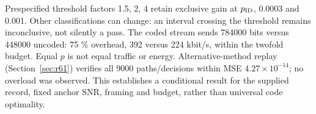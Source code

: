 Prespecified threshold factors 1.5, 2, 4 retain exclusive gain at $ p_{\rm ID}$,
0.0003 and 0.001. Other classifications can change: an interval crossing
the threshold remains inconclusive, not silently a pass.
The coded stream sends 784000 bits versus 448000 uncoded: 75 \% overhead,
392 versus 224 kbit/s, within the twofold budget. Equal $ p $ is not equal
traffic or energy. Alternative-method replay (Section~\ref{sec:r61})
verifies all 9000 paths/decisions within MSE $4.27\times10^{-14}$;
no overload was observed.
This establishes a conditional result for the supplied record, fixed
anchor SNR, framing and budget, rather than universal code optimality.
